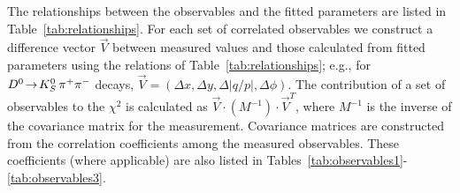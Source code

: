 The relationships between the observables and the fitted
parameters are listed in Table~\ref{tab:relationships}. 
For each set of correlated observables we construct a
difference vector $\vec{V}$ between measured values and
those calculated from fitted parameters using the
relations of Table~\ref{tab:relationships}; e.g., for 
$D^0\!\rightarrow\! K^0_S\,\pi^+\pi^-$ decays,
$\vec{V}=(\Delta x,\Delta y,\Delta |q/p|,\Delta \phi)$.
The contribution of a set of observables to the $\chi^2$ 
is calculated as $\vec{V}\cdot (M^{-1})\cdot\vec{V}^T$, 
where $M^{-1}$ is the inverse of the covariance matrix 
for the measurement. Covariance matrices are constructed 
from the correlation coefficients among the measured observables.
These coefficients (where applicable) are also listed in 
Tables~\ref{tab:observables1}-\ref{tab:observables3}. 

